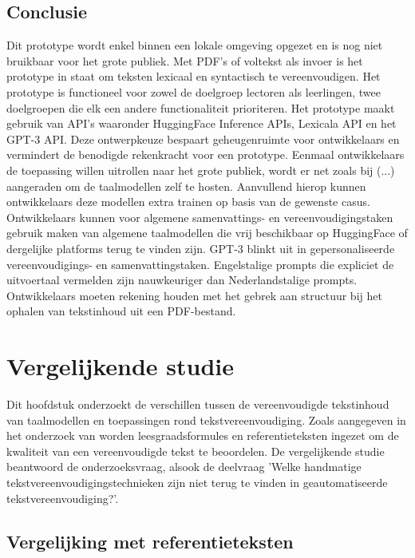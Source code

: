 \section{Conclusie}

Dit prototype wordt enkel binnen een lokale omgeving opgezet en is nog niet bruikbaar voor het grote publiek. Met PDF's of voltekst als invoer is het prototype in staat om teksten lexicaal en syntactisch te vereenvoudigen. Het prototype is functioneel voor zowel de doelgroep lectoren als leerlingen, twee doelgroepen die elk een andere functionaliteit prioriteren. Het prototype maakt gebruik van API's waaronder HuggingFace Inference APIs, Lexicala API en het GPT-3 API. Deze ontwerpkeuze bespaart geheugenruimte voor ontwikkelaars en vermindert de benodigde rekenkracht voor een prototype. Eenmaal ontwikkelaars de toepassing willen uitrollen naar het grote publiek, wordt er net zoals bij (...) aangeraden om de taalmodellen zelf te hosten. Aanvullend hierop kunnen ontwikkelaars deze modellen extra trainen op basis van de gewenste casus. Ontwikkelaars kunnen voor algemene samenvattings- en vereenvoudigingstaken gebruik maken van algemene taalmodellen die vrij beschikbaar op HuggingFace of dergelijke platforms terug te vinden zijn. GPT-3 blinkt uit in gepersonaliseerde vereenvoudigings- en samenvattingstaken. Engelstalige prompts die expliciet de uitvoertaal vermelden zijn nauwkeuriger dan Nederlandstalige prompts. Ontwikkelaars moeten rekening houden met het gebrek aan structuur bij het ophalen van tekstinhoud uit een PDF-bestand.

\chapter{Vergelijkende studie}

Dit hoofdstuk onderzoekt de verschillen tussen de vereenvoudigde tekstinhoud van taalmodellen en toepassingen rond tekstvereenvoudiging. Zoals aangegeven in het onderzoek van \textcite{Nenkova2004} worden leesgraadsformules en referentieteksten ingezet om de kwaliteit van een vereenvoudigde tekst te beoordelen. De vergelijkende studie beantwoord de onderzoeksvraag, alsook de deelvraag 'Welke handmatige tekstvereenvoudigingstechnieken zijn niet terug te vinden in geautomatiseerde tekstvereenvoudiging?'.

\section{Vergelijking met referentieteksten}

